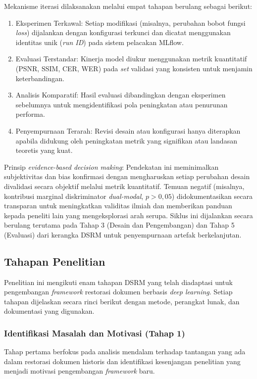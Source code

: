 \documentclass[12pt,a4paper]{article}
\begin{document}
Mekanisme iterasi dilaksanakan melalui empat tahapan berulang sebagai berikut:
\begin{enumerate}[label=\arabic*., leftmargin=1.5em, labelsep=0.5em, itemindent=0pt, noitemsep, topsep=0pt]
    \item Eksperimen Terkawal: Setiap modifikasi (misalnya, perubahan bobot fungsi \textit{loss}) dijalankan dengan konfigurasi terkunci dan dicatat menggunakan identitas unik (\textit{run ID}) pada sistem pelacakan MLflow.
    \item Evaluasi Terstandar: Kinerja model diukur menggunakan metrik kuantitatif (PSNR, SSIM, CER, WER) pada \textit{set} validasi yang konsisten untuk menjamin keterbandingan.
    \item Analisis Komparatif: Hasil evaluasi dibandingkan dengan eksperimen sebelumnya untuk mengidentifikasi pola peningkatan atau penurunan performa.
    \item Penyempurnaan Terarah: Revisi desain atau konfigurasi hanya diterapkan apabila didukung oleh peningkatan metrik yang signifikan atau landasan teoretis yang kuat.
\end{enumerate}

Prinsip \textit{evidence-based decision making}: Pendekatan ini meminimalkan subjektivitas dan bias konfirmasi dengan mengharuskan setiap perubahan desain divalidasi secara objektif melalui metrik kuantitatif. Temuan negatif (misalnya, kontribusi marginal diskriminator \textit{dual-modal}, $p>0,05$) didokumentasikan secara transparan untuk meningkatkan validitas ilmiah dan memberikan panduan kepada peneliti lain yang mengeksplorasi arah serupa. Siklus ini dijalankan secara berulang terutama pada Tahap 3 (Desain dan Pengembangan) dan Tahap 5 (Evaluasi) dari kerangka DSRM untuk penyempurnaan artefak berkelanjutan.

\subsection{Tahapan Penelitian}
\label{subsec:tahapan-penelitian}

Penelitian ini mengikuti enam tahapan DSRM yang telah diadaptasi untuk pengembangan \textit{framework} restorasi dokumen berbasis \textit{deep learning}. Setiap tahapan dijelaskan secara rinci berikut dengan metode, perangkat lunak, dan dokumentasi yang digunakan.

\subsubsection{Identifikasi Masalah dan Motivasi (Tahap 1)}
Tahap pertama berfokus pada analisis mendalam terhadap tantangan yang ada dalam restorasi dokumen historis dan identifikasi kesenjangan penelitian yang menjadi motivasi pengembangan \textit{framework} baru.
\end{document}
